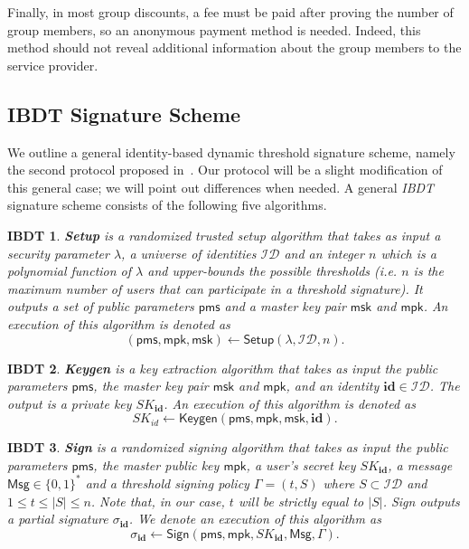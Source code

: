 \documentclass[11pt]{llncs}
\def\pms{\mathsf{pms}}
\def\msk{\mathsf{msk}}
\def\mpk{\mathsf{mpk}}
\def\Msg{\mathsf{Msg}}
\newtheorem{ibdtproto}{IBDT}
\begin{document}
Finally, in most group discounts, a fee must
be paid after proving the number of group members,
so an anonymous payment method is needed.
Indeed, this method should not reveal additional
information about the group members
to the service provider.


\subsection{IBDT Signature Scheme}\label{ab.subsec.ibdt}

We outline a general
identity-based dynamic threshold signature scheme, namely
the second protocol proposed in~\cite{ab.Herranz2012}.
Our protocol will be a slight modification of this general
case; we will point out differences when needed.
A general \emph{IBDT} signature scheme
consists of the following five algorithms.

\begin{ibdtproto}\label{ab.ibdtproto.setup}
\textbf{Setup} is a randomized trusted setup algorithm
that takes as input a security parameter $\lambda$,
a universe of identities $\mathcal{ID}$ and an integer $n$
which is a polynomial function of $\lambda$ and upper-bounds
the possible thresholds
(\emph{i.e.} $n$ is the maximum number of users that can participate
in a threshold signature).
It outputs a set of public parameters $\pms$
and a master key pair $\msk$ and $\mpk$.
An execution of this algorithm is denoted as
$$(\pms, \mpk, \msk) \leftarrow \mathsf{Setup}\left(\lambda, \mathcal{ID}, n\right).$$
\end{ibdtproto}

\begin{ibdtproto}\label{ab.ibdtproto.keygen}
\textbf{Keygen} is a key extraction algorithm that
takes as input the public parameters $\pms$,
the master key pair $\msk$ and $\mpk$,
and an identity $\mathbf{id} \in \mathcal{ID}$.
The output is a private key $SK_{\mathbf{id}}$.
An execution of this algorithm is denoted as
$$SK_{id} \leftarrow \mathsf{Keygen}\left(\pms, \mpk, \msk, \mathbf{id}\right).$$
\end{ibdtproto}

\begin{ibdtproto}\label{ab.ibdtproto.sign}
\textbf{Sign} is a randomized signing algorithm
that takes as input the public parameters $\pms$,
the master public key $\mpk$, a user's secret key $SK_{\mathbf{id}}$,
a message $\mathsf{Msg} \in \{0,1\}^{*}$ and
a threshold signing policy
$\Gamma = (t,S)$ where $S \subset \mathcal{ID}$ and $1 \le t \le |S| \le n$.
Note that, in our case, $t$ will be strictly equal to $|S|$.
Sign outputs a partial signature $\sigma_{\mathbf{id}}$.
We denote an execution of this algorithm as
$$\sigma_{\mathbf{id}} \leftarrow \mathsf{Sign}\left(\pms, \mpk, SK_{\mathbf{id}}, \Msg, \Gamma\right).$$
\end{ibdtproto}
\end{document}
